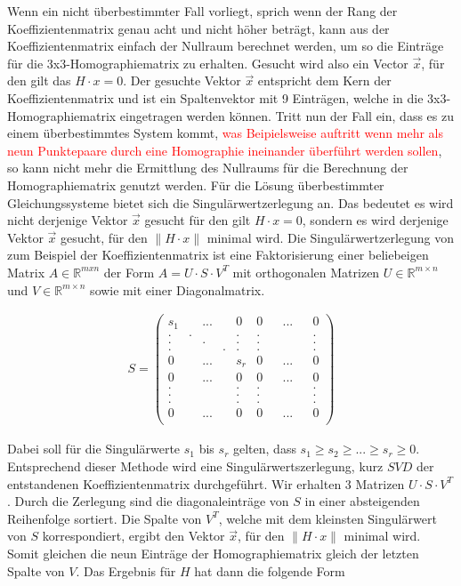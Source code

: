 Wenn ein nicht überbestimmter Fall vorliegt, sprich wenn der Rang der Koeffizientenmatrix genau acht und nicht höher beträgt, kann aus der Koeffizientenmatrix einfach der Nullraum berechnet werden, um so die Einträge für die 3x3-Homographiematrix zu erhalten\cite{HZ,Elements,Schwarz}. Gesucht wird also ein Vector $\vec{x}$, für den gilt das $H \cdot x = 0$. Der gesuchte Vektor $\vec{x}$ entspricht dem Kern der Koeffizientenmatrix und ist ein Spaltenvektor mit 9 Einträgen, welche in die 3x3-Homographiematrix eingetragen werden können\cite{HZ,Schwarz}. Tritt nun der Fall ein, dass es zu einem überbestimmtes System kommt, \textcolor{red}{was Beipielsweise auftritt wenn mehr als neun Punktepaare durch eine Homographie ineinander überführt werden sollen}, so kann nicht mehr die Ermittlung des Nullraums für die Berechnung der Homographiematrix genutzt werden. Für die Lösung überbestimmter Gleichungssysteme bietet sich die Singulärwertzerlegung an\cite{HZ}\cite{Scholz}. Das bedeutet es wird nicht derjenige Vektor $\vec{x}$ gesucht für den gilt $H \cdot x = 0$, sondern es wird derjenige Vektor $\vec{x}$ gesucht, für den \ensuremath{\parallel H \cdot x\parallel} minimal wird\cite{HZ,Schwarz}. Die Singulärwertzerlegung von zum Beispiel der Koeffizientenmatrix ist eine Faktorisierung einer beliebeigen Matrix \ensuremath{A \in \mathbb{R}^{mxn}} der Form \ensuremath{A = U \cdot S \cdot V^T} mit orthogonalen Matrizen \ensuremath{U \in \mathbb{R}^{m \times n}} und \ensuremath{V \in \mathbb{R}^{m \times n}} sowie mit einer Diagonalmatrix. 

\begin{gather}
	S = \begin{pmatrix}
		s_1&&...&&0&0&&...&&0\\
		.&.&&&.&.&&&&.\\
		.&&.&&.&.&&&&.\\
		.&&&.&.&.&&&&.\\
		0&&...&&s_r&0&&...&&0\\	
		0&&...&&0&0&&...&&0\\
		.&&&&.&.&&&&.\\
		.&&&&.&.&&&&.\\	
		.&&&&.&.&&&&.\\	
		0&&...&&0&0&&...&&0\\	
	\end{pmatrix}
\end{gather}

Dabei soll für die Singulärwerte $s_1$ bis $s_r$ gelten, dass \ensuremath{s_1 \geq s_2 \geq ... \geq s_r \ge 0 }\cite{Scholz}. Entsprechend dieser Methode wird eine Singulärwertszerlegung, kurz $SVD$ der entstandenen Koeffizientenmatrix durchgeführt. Wir erhalten 3 Matrizen $U \cdot S\cdot V^T$. Durch die Zerlegung sind die diagonaleinträge von $S$ in einer absteigenden Reihenfolge sortiert. Die Spalte von $V^T$, welche mit dem kleinsten Singulärwert von $S$ korrespondiert, ergibt den Vektor $\vec{x}$, für den \ensuremath{\parallel H \cdot x\parallel} minimal wird. Somit gleichen die neun Einträge der Homographiematrix gleich der letzten Spalte von $V$. Das Ergebnis für $H$ hat dann die folgende Form

